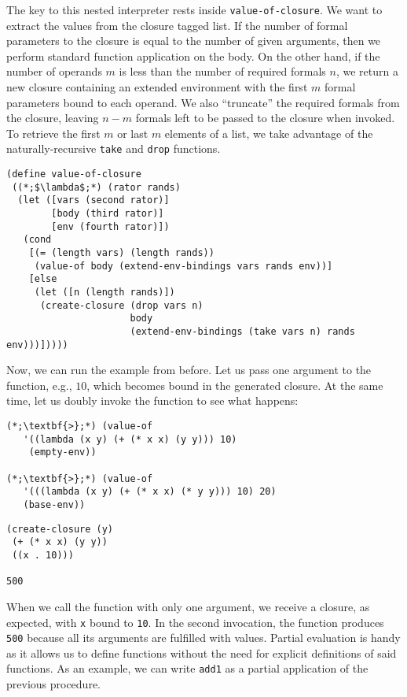 The key to this nested interpreter rests inside \texttt{value-of-closure}. We want to extract the values from the closure tagged list. If the number of formal parameters to the closure is equal to the number of given arguments, then we perform standard function application on the body. On the other hand, if the number of operands $m$ is less than the number of required formals $n$, we return a new closure containing an extended environment with the first $m$ formal parameters bound to each operand. We also ``truncate'' the required formals from the closure, leaving $n - m$ formals left to be passed to the closure when invoked. To retrieve the first $m$ or last $m$ elements of a list, we take advantage of the naturally-recursive \texttt{take} and \texttt{drop} functions.

\begin{cl}[]{}
\begin{lstlisting}[language=MyScheme]
(define value-of-closure
 ((*;$\lambda$;*) (rator rands)
  (let ([vars (second rator)]
        [body (third rator)]
        [env (fourth rator)])
   (cond
    [(= (length vars) (length rands))
     (value-of body (extend-env-bindings vars rands env))]
    [else
     (let ([n (length rands)])
      (create-closure (drop vars n)
                      body
                      (extend-env-bindings (take vars n) rands env)))]))))
\end{lstlisting}
\end{cl}

Now, we can run the example from before. Let us pass one argument to the function, e.g., $10$, which becomes bound in the generated closure. At the same time, let us doubly invoke the function to see what happens:

\begin{clo}[]{}
\begin{lstlisting}[language=MySOutput]
(*;\textbf{>};*) (value-of 
   '((lambda (x y) (+ (* x x) (y y))) 10)
    (empty-env))

(*;\textbf{>};*) (value-of 
   '(((lambda (x y) (+ (* x x) (* y y))) 10) 20) 
   (base-env))
\end{lstlisting}
\tcblower
\begin{lstlisting}[language=MyOutput]
(create-closure (y) 
 (+ (* x x) (y y)) 
 ((x . 10)))
 
500
\end{lstlisting}
\end{clo}

When we call the function with only one argument, we receive a closure, as expected, with \texttt{x} bound to \texttt{10}. In the second invocation, the function produces \texttt{500} because all its arguments are fulfilled with values. Partial evaluation is handy as it allows us to define functions without the need for explicit definitions of said functions. As an example, we can write \texttt{add1} as a partial application of the previous procedure.

